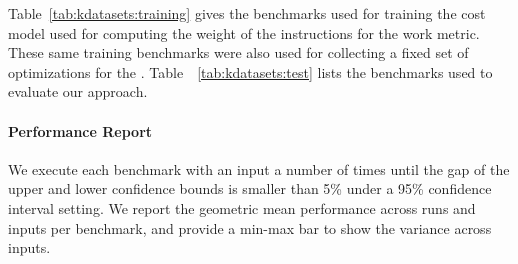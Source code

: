 
Table~\ref{tab:kdatasets:training} gives the benchmarks used for training the cost model used for computing the weight of the instructions
for the work metric. These same training benchmarks were also used for collecting a fixed set of optimizations for the {\itercomp}.
Table~~\ref{tab:kdatasets:test} lists the benchmarks used to evaluate our approach.


\paragraph{Performance Report}
We execute each benchmark with an input a number of times until the gap of the upper and lower confidence bounds is smaller than 5\% under
a 95\% confidence interval setting. We report the geometric mean performance across runs and inputs per benchmark, and provide a min-max
bar to show the variance across inputs.
